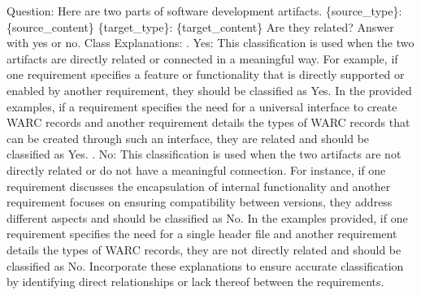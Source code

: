 Question: Here are two parts of software development artifacts.\newline
\newline
\{source\_type\}: \textquotesingle{}\textquotesingle{}\textquotesingle{}\{source\_content\}\textquotesingle{}\textquotesingle{}\textquotesingle{}\newline
\newline
\{target\_type\}: \textquotesingle{}\textquotesingle{}\textquotesingle{}\{target\_content\}\textquotesingle{}\textquotesingle{}\textquotesingle{}\newline
Are they related?\newline
\newline
Answer with \textquotesingle{}yes\textquotesingle{} or \textquotesingle{}no\textquotesingle{}.\newline
\newline
Class Explanations:\newline
{}. \*\*Yes\*\*: This classification is used when the two artifacts are directly related or connected in a meaningful way. For example, if one requirement specifies a feature or functionality that is directly supported or enabled by another requirement, they should be classified as \textquotesingle{}Yes\textquotesingle{}. In the provided examples, if a requirement specifies the need for a universal interface to create WARC records and another requirement details the types of WARC records that can be created through such an interface, they are related and should be classified as \textquotesingle{}Yes\textquotesingle{}.\newline
{}. \*\*No\*\*: This classification is used when the two artifacts are not directly related or do not have a meaningful connection. For instance, if one requirement discusses the encapsulation of internal functionality and another requirement focuses on ensuring compatibility between versions, they address different aspects and should be classified as \textquotesingle{}No\textquotesingle{}. In the examples provided, if one requirement specifies the need for a single header file and another requirement details the types of WARC records, they are not directly related and should be classified as \textquotesingle{}No\textquotesingle{}.\newline
\newline
Incorporate these explanations to ensure accurate classification by identifying direct relationships or lack thereof between the requirements.